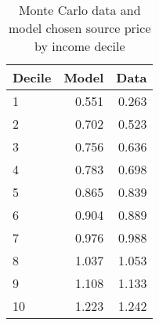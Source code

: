 \begin{table}[!ht]
	\centering
		\caption{Monte Carlo data and model chosen source price by income decile}
\begin{tabular}{lrr}
		\toprule
         Decile&     Model&      Data\\
		\midrule
		              1&     0.551&     0.263\\
		              2&     0.702&     0.523\\
		              3&     0.756&     0.636\\
		              4&     0.783&     0.698\\
		              5&     0.865&     0.839\\
		              6&     0.904&     0.889\\
		              7&     0.976&     0.988\\
		              8&     1.037&     1.053\\
		              9&     1.108&     1.133\\
		             10&     1.223&     1.242\\
		\bottomrule
	\end{tabular}
\end{table}
